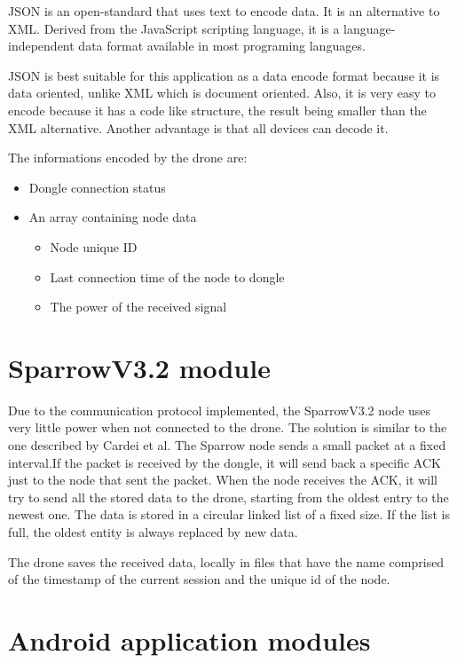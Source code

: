 JSON \cite{json} is an open-standard that uses text to encode data. It is an alternative to XML. Derived from the JavaScript scripting language, it is a language-independent data format available in most programing languages.

JSON is best suitable for this application as a data encode format because it is data oriented, unlike XML which is document oriented. Also, it is very easy to encode because it has a code like structure, the result being smaller than the XML alternative. Another advantage is that all devices can decode it.

The informations encoded by the drone are:
\begin{itemize}

\item Dongle connection status
\item An array containing node data
\begin{itemize}
‏
	\item Node unique ID
	\item Last connection time of the node to dongle
	\item The power of the received signal

	\end{itemize}
\end{itemize}


\section{SparrowV3.2 module}

Due to the communication protocol implemented, the SparrowV3.2 node uses very little power when not connected to
the drone. The solution is similar to the one described by Cardei et al\cite{cardei2005improving}. The Sparrow node sends a small packet at a fixed interval.If the packet is received by the dongle, it will send back a specific ACK just to the node that sent the packet. When the node receives the ACK, it will try to send all the stored data to the drone, starting from the oldest entry to the newest one. The data is stored in a circular linked list of a fixed size. If the list is full, the oldest entity is always replaced by new data.

The drone saves the received data, locally in files that have the name comprised of the timestamp of the current session and the unique id of the node.

\section{Android application modules}

